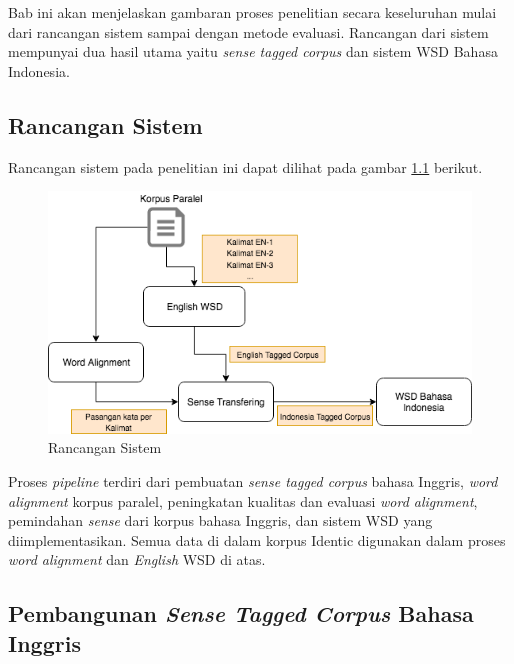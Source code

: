 \chapter{\babTiga}
Bab ini akan menjelaskan gambaran proses penelitian secara keseluruhan mulai dari rancangan sistem sampai dengan metode evaluasi. Rancangan dari sistem mempunyai dua hasil utama yaitu \textit{sense tagged corpus} dan sistem WSD Bahasa Indonesia.

\section{Rancangan Sistem}

Rancangan sistem pada penelitian ini dapat dilihat pada gambar \ref{fig:Rancangan-Sistem} berikut.

\begin{figure}
	\centering
	\includegraphics[width=1\linewidth]{adit_pics/WSD-full.png}
	\caption{Rancangan Sistem}
	\label{fig:Rancangan-Sistem}
\end{figure}

Proses \textit{pipeline} terdiri dari pembuatan \textit{sense tagged corpus} bahasa Inggris,  \textit{word alignment} korpus paralel, peningkatan kualitas dan evaluasi \textit{word alignment}, pemindahan \textit{sense} dari korpus bahasa Inggris, dan sistem WSD yang diimplementasikan. Semua data di dalam korpus Identic digunakan dalam proses \textit{word alignment} dan \textit{English} WSD di atas.

\section{Pembangunan \textit{Sense Tagged Corpus} Bahasa Inggris}

